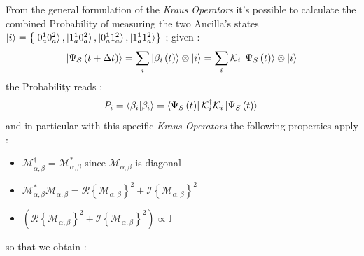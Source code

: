 \documentclass[a4paper,12pt]{article}
\begin{document}
\newpage

From the general formulation of the \textit{Kraus Operators} it's possible to calculate the combined Probability of measuring the two Ancilla's states $ \ket{i} = \left\{ \ket{0_{a}^{1}0_{a}^{2}}, \ket{1_{a}^{1}0_{a}^{2}}, \ket{0_{a}^{1}1_{a}^{2}}, \ket{1_{a}^{1}1_{a}^{2}} \right\} $ ; given :
\begin{equation}
		\ket{\Psi_{\mathcal{S}} \left( t + \Delta t\right)} = \sum_{i}{\ket{\beta_{i} \left( t \right)} \otimes \ket{i}} = \sum_{i}{\mathcal{K}_{i} \ket{\Psi_{S} \left( t \right)} \otimes \ket{i} }
\end{equation}
the Probability reads : 
\begin{equation}
	P_{i} = \braket{\beta_{i} | \beta_{i}} = \bra{\Psi_{S} \left( t \right)} \mathcal{K}_{i}^{\dagger} \mathcal{K}_{i} \ket{\Psi_{S} \left( t \right)} \\
\end{equation}
and in particular with this specific \textit{Kraus Operators} the following properties apply : 
\begin{itemize}
	\item $ \mathcal{M}_{\alpha,\beta}^{\dagger} = \mathcal{M}_{\alpha,\beta}^{*}  $ since $ \mathcal{M}_{\alpha,\beta} $ is diagonal
	\item $ \mathcal{M}_{\alpha,\beta}^{*} \mathcal{M}_{\alpha,\beta} = \mathcal{R} \left\{ \mathcal{M}_{\alpha,\beta} \right\}^{2} + \mathcal{I} \left\{ \mathcal{M}_{\alpha,\beta} \right\}^{2} $ 
	\item $ \left(\mathcal{R} \left\{ \mathcal{M}_{\alpha,\beta} \right\}^{2} + \mathcal{I} \left\{ \mathcal{M}_{\alpha,\beta} \right\}^{2} \right)\propto \mathbb{I} $ 
\end{itemize} 
so that we obtain : 
\end{document}
